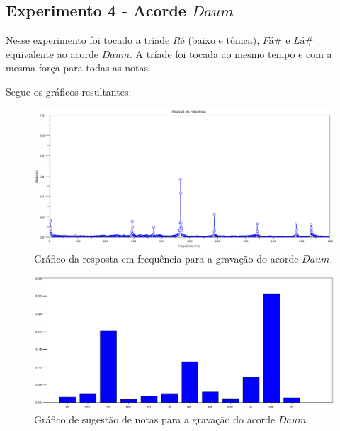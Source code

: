 \subsection{Experimento 4 - Acorde $Daum$}
\label{sec:experimento4}

Nesse experimento foi tocado a tríade $Ré$ (baixo e tônica), $Fá\#$ e $Lá\#$ equivalente ao acorde $Daum$. A tríade foi tocada ao mesmo tempo e com a mesma força para todas as notas.

Segue os gráficos resultantes:

\begin{figure}[h]
	\centering
		\includegraphics[keepaspectratio=true,scale=0.49]{figuras/Dm/fft_Daum.eps}
	\caption{Gráfico da resposta em frequência para a gravação do acorde $Daum$.}
  \label{fig:espectro_Daum}
\end{figure}

\begin{figure}[h]
	\centering
		\includegraphics[keepaspectratio=true,scale=0.49]{figuras/Dm/notas_Daum.eps}
	\caption{Gráfico de sugestão de notas para a gravação do acorde $Daum$.}
  \label{fig:notas_Daum}
\end{figure}

